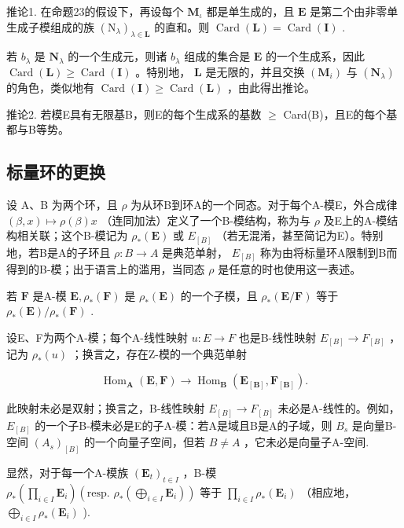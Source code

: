 推论1. 在命题23的假设下，再设每个 \(\mathbf{M}_{\iota}\) 都是单生成的，且 \(\mathbf{E}\) 是第二个由非零单生成子模组成的族 \((\mathrm{N}_{\lambda})_{\lambda \in \mathbf{L}}\) 的直和。则 \(\operatorname{Card}(\mathbf{L}) = \operatorname{Card}(\mathbf{I})\) .

若 \(b_{\lambda}\) 是 \(\mathbf{N}_{\lambda}\) 的一个生成元，则诸 \(b_{\lambda}\) 组成的集合是 \(\mathbf{E}\) 的一个生成系，因此 \(\operatorname{Card}(\mathbf{L}) \geqslant \operatorname{Card}(\mathbf{I})\) 。特别地， \(\mathbf{L}\) 是无限的，并且交换 \((\mathbf{M}_i)\) 与 \((\mathbf{N}_{\lambda})\) 的角色，类似地有 \(\operatorname{Card}(\mathbf{I}) \geqslant \operatorname{Card}(\mathbf{L})\) ，由此得出推论。

推论2. 若模E具有无限基B，则E的每个生成系的基数 \(\geqslant\) Card(B)，且E的每个基都与B等势。

\subsection{标量环的更换}

设 A、B 为两个环，且 \(\rho\) 为从环B到环A的一个同态。对于每个A-模E，外合成律 \((\beta, x) \mapsto \rho(\beta)x\) （连同加法）定义了一个B-模结构，称为与 \(\rho\) 及E上的A-模结构相关联；这个B-模记为 \(\rho_{*}(\mathbf{E})\) 或 \(E_{[B]}\) （若无混淆，甚至简记为E）。特别地，若B是A的子环且 \(\rho: B \to A\) 是典范单射， \(E_{[B]}\) 称为由将标量环A限制到B而得到的B-模；出于语言上的滥用，当同态 \(\rho\) 是任意的时也使用这一表述。

若 \(\mathbf{F}\) 是A-模 \(\mathbf{E},\rho_{*}(\mathbf{F})\) 是 \(\rho_{*}(\mathbf{E})\) 的一个子模，且 \(\rho_{*}(\mathbf{E} / \mathbf{F})\) 等于 \(\rho_{*}(\mathbf{E}) / \rho_{*}(\mathbf{F})\) .

设E、F为两个A-模；每个A-线性映射 \(u: E \rightarrow F\) 也是B-线性映射 \(E_{[B]} \rightarrow F_{[B]}\) ，记为 \(\rho_{*}(u)\) ；换言之，存在Z-模的一个典范单射

\[
\operatorname{Hom} _ {\mathbf {A}} (\mathbf {E}, \mathbf {F}) \rightarrow \operatorname{Hom} _ {\mathbf {B}} (\mathbf {E} _ {[ \mathbf {B} ]}, \mathbf {F} _ {[ \mathbf {B} ]}).\tag{47}
\]

此映射未必是双射；换言之，B-线性映射 \(E_{[B]} \rightarrow F_{[B]}\) 未必是A-线性的。例如， \(E_{[B]}\) 的一个子B-模未必是E的子A-模：若A是域且B是A的子域，则 \(B_{s}\) 是向量B-空间 \((A_{s})_{[B]}\) 的一个向量子空间，但若 \(B \neq A\) ，它未必是向量子A-空间.

显然，对于每一个A-模族 \((\mathbf{E}_t)_{t\in I}\) ，B-模 \(\rho_{*}\left(\prod_{i\in I}\mathbf{E}_{i}\right)\left(\text{resp. } \rho_{*}\left(\bigoplus_{i\in I}\mathbf{E}_{i}\right)\right)\) 等于 \(\prod_{i\in I}\rho_{*}(\mathbf{E}_{i})\) （相应地， \(\bigoplus_{i\in I}\rho_{*}(\mathbf{E}_{i})\) ).

